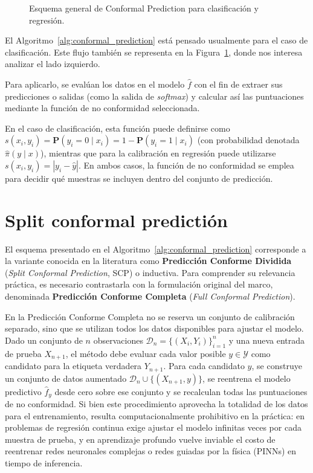 \begin{figure}[H]
    \centering
    \resizebox{1.04\textwidth}{!}{%
        
    }
    \caption{Esquema general de Conformal Prediction para clasificación y regresión.}
    \label{fig:conformal_prediction}
\end{figure}

El Algoritmo~\ref{alg:conformal_prediction} está pensado usualmente para el caso de clasificación. Este flujo también se representa en la Figura~\ref{fig:conformal_prediction}, donde nos interesa analizar el lado izquierdo.

Para aplicarlo, se evalúan los datos en el modelo $\hat{f}$ con el fin de extraer sus predicciones o salidas (como la salida de \textit{softmax}) y calcular así las puntuaciones mediante la función de no conformidad seleccionada.

En el caso de clasificación, esta función puede definirse como $s(x_i,y_i) = \mathbf{P}(y_i=0 \mid x_i) = 1 - \mathbf{P}(y_i=1 \mid x_i)$ (con probabilidad denotada $\hat{\pi}(y \mid x)$), mientras que para la calibración en regresión puede utilizarse $s(x_i,y_i) = |y_i - \hat{y}|$. En ambos casos, la función de no conformidad se emplea para decidir qué muestras se incluyen dentro del conjunto de predicción.

\section{Split conformal predictión}

El esquema presentado en el Algoritmo~\ref{alg:conformal_prediction} corresponde a la variante 
conocida en la literatura como \textbf{Predicción Conforme Dividida} (\textit{Split Conformal Prediction}, 
SCP) o inductiva. Para comprender su relevancia práctica, es necesario contrastarla 
con la formulación original del marco, 
denominada \textbf{Predicción Conforme Completa} (\textit{Full Conformal Prediction}).

En la Predicción Conforme Completa no se reserva un conjunto de calibración separado, 
sino que se utilizan todos los datos disponibles para ajustar el modelo. 
Dado un conjunto de $n$ observaciones $\mathcal{D}_n = \{(X_i, Y_i)\}_{i=1}^n$ y 
una nueva entrada de prueba $X_{n+1}$, el método debe evaluar cada valor posible 
$y \in \mathcal{Y}$ como candidato para la etiqueta verdadera $Y_{n+1}$.  
Para cada candidato $y$, se construye un conjunto de datos aumentado $\mathcal{D}_n \cup \{(X_{n+1}, y)\}$, 
se reentrena el modelo predictivo $\hat{f}_y$ desde cero sobre ese conjunto y se recalculan todas 
las puntuaciones de no conformidad. Si bien este procedimiento aprovecha la totalidad 
de los datos para el entrenamiento, resulta computacionalmente prohibitivo en la práctica: 
en problemas de regresión continua exige ajustar el modelo infinitas veces por cada muestra 
de prueba, y en aprendizaje profundo vuelve inviable el costo de reentrenar redes 
neuronales complejas o redes guiadas por la física (PINNs) en tiempo de inferencia.

